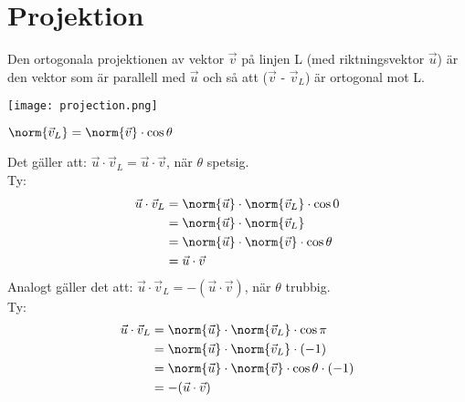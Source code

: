 
\section{Projektion} %
\label{sec:projektion}

\begin{Def}
    Den ortogonala projektionen av vektor $\vec{v}$ på linjen L (med riktningsvektor $\vec{u}$) är den vektor som är parallell med $\vec{u}$ och så att ($\vec{v}$ - $\vec{v}_L$) är ortogonal mot L.
\end{Def}
\begin{center}
  \centering
  \texttt{[image: projection.png]}
\end{center}
\begin{Rem}
    $\norm{\vec{v}_L} = \norm{\vec{v}} \cdot \cos{\theta}$
\end{Rem}
\noindent
Det gäller att: $\vec{u} \cdot \vec{v}_L = \vec{u} \cdot \vec{v}$, när $\theta$ spetsig.\\
Ty:
\begin{align*}
    \vec{u} \cdot \vec{v}_L &= \norm{\vec{u}} \cdot \norm{\vec{v}_L} \cdot \cos{0}\\
    &= \norm{\vec{u}} \cdot \norm{\vec{v}_L} \\
    &= \norm{\vec{u}} \cdot \norm{\vec{v}} \cdot \cos{\theta} \\
    &= \vec{u} \cdot \vec{v}
\end{align*}
Analogt gäller det att: $\vec{u} \cdot \vec{v}_L = -(\vec{u} \cdot \vec{v})$, när $\theta$ trubbig.\\
Ty:
\begin{align*}
    \vec{u} \cdot \vec{v}_L &= \norm{\vec{u}} \cdot \norm{\vec{v}_L} \cdot \cos{\pi}\\
    &= \norm{\vec{u}} \cdot \norm{\vec{v}_L} \cdot (-1) \\
    &= \norm{\vec{u}} \cdot \norm{\vec{v}} \cdot \cos{\theta} \cdot (-1)\\
    &= -(\vec{u} \cdot \vec{v})
\end{align*}

